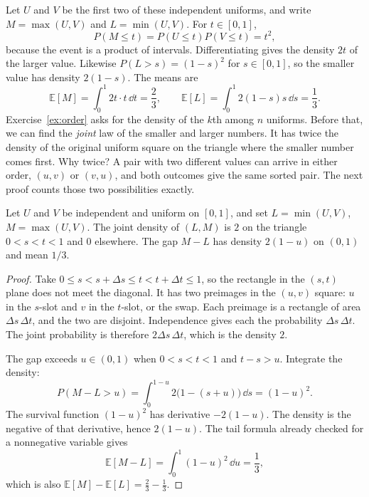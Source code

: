 \begin{examplex}
Let $U$ and $V$ be the first two of these independent uniforms, and write $M=\max(U,V)$ and $L=\min(U,V)$. For $t\in[0,1]$,
\[
 P(M\le t)=P(U\le t)P(V\le t)=t^2,
\]
because the event is a product of intervals. Differentiating gives the density $2t$ of the larger value. Likewise $P(L>s)=(1-s)^2$ for $s\in[0,1]$, so the smaller value has density $2(1-s)$. The means are
\[
 \mathbb E[M]=\int_0^1 2t\cdot t\,\dd t=\frac23,\qquad
 \mathbb E[L]=\int_0^1 2(1-s)s\,\dd s=\frac13.
\]
Exercise~\ref{ex:order} asks for the density of the $k$th among $n$ uniforms. Before that, we can find the \emph{joint} law of the smaller and larger numbers. It has twice the density of the original uniform square on the triangle where the smaller number comes first. Why twice? A pair with two different values can arrive in either order, $(u,v)$ or $(v,u)$, and both outcomes give the same sorted pair. The next proof counts those two possibilities exactly.
\end{examplex}

\begin{proposition}\label{prop:orderpair}
Let $U$ and $V$ be independent and uniform on $[0,1]$, and set $L=\min(U,V)$, $M=\max(U,V)$. The joint density of $(L,M)$ is $2$ on the triangle $0<s<t<1$ and $0$ elsewhere. The gap $M-L$ has density $2(1-u)$ on $(0,1)$ and mean $1/3$.
\end{proposition}
\begin{proof}
Take $0\le s<s+\Delta s\le t<t+\Delta t\le 1$, so the rectangle in the $(s,t)$ plane does not meet the diagonal. It has two preimages in the $(u,v)$ square: $u$ in the $s$-slot and $v$ in the $t$-slot, or the swap. Each preimage is a rectangle of area $\Delta s\,\Delta t$, and the two are disjoint. Independence gives each the probability $\Delta s\,\Delta t$. The joint probability is therefore $2\Delta s\,\Delta t$, which is the density $2$.

The gap exceeds $u\in(0,1)$ when $0<s<t<1$ and $t-s>u$. Integrate the density:
\[
 P(M-L>u)=\int_0^{1-u} 2\bigl(1-(s+u)\bigr)\,\dd s=(1-u)^2.
\]
The survival function $(1-u)^2$ has derivative $-2(1-u)$. The density is the negative of that derivative, hence $2(1-u)$. The tail formula already checked for a nonnegative variable gives
\[
 \mathbb E[M-L]=\int_0^1(1-u)^2\,\dd u=\frac13,
\]
which is also $\mathbb E[M]-\mathbb E[L]=\tfrac23-\tfrac13$.
\end{proof}

